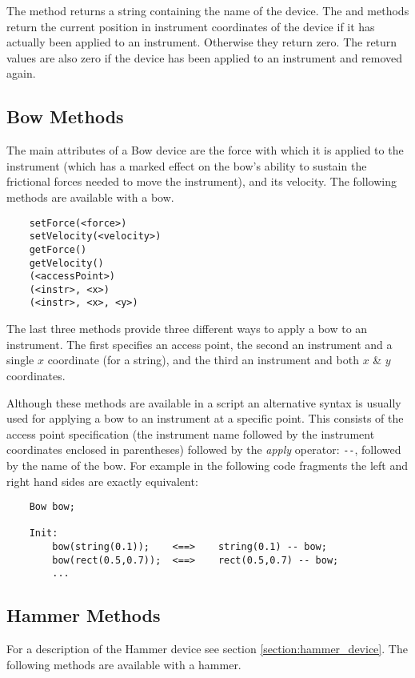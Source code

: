 The  method returns a string containing the
name of the device. The  and 
methods return the current position in instrument coordinates of
the device if it has actually been applied to an instrument.
Otherwise they return zero. The return values are also zero
if the device has been applied to an instrument and removed
again.

\subsection{Bow Methods}
The main attributes of a Bow device are the force with which
it is applied to the instrument (which has a marked effect on the bow's
ability to sustain the frictional forces needed to move the instrument),
and its velocity. The following methods are available with a bow.

\begin{verbatim}
    setForce(<force>)
    setVelocity(<velocity>)
    getForce()
    getVelocity()
    (<accessPoint>)
    (<instr>, <x>)
    (<instr>, <x>, <y>)
\end{verbatim}

The last three methods provide three different ways to apply
a bow to an instrument. The first specifies an access point, the second
an instrument and a single $x$ coordinate (for a string), and 
the third an instrument and both $x$ \& $y$ coordinates.

Although these methods are available in a script an alternative
syntax is usually used for applying a bow to an instrument at a specific
point. This consists of the access point specification (the instrument
name followed by the instrument coordinates enclosed in parentheses)
followed by the \emph{apply} operator: \verb|--|, followed by the
name of the bow. For example in the following code fragments the left
and right hand sides are exactly equivalent:

\begin{verbatim}
    Bow bow;
    
    Init:
        bow(string(0.1));    <==>    string(0.1) -- bow;
        bow(rect(0.5,0.7));  <==>    rect(0.5,0.7) -- bow;
        ...
\end{verbatim}

\subsection{Hammer Methods}
For a description of the Hammer device see section \ref{section:hammer_device}.
The following methods are available with a hammer.

